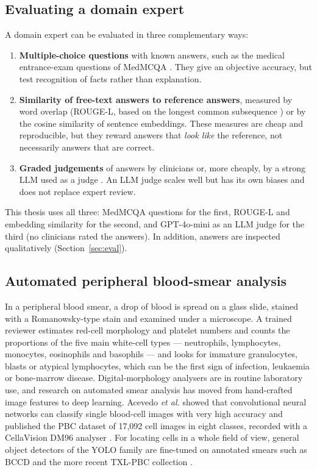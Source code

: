 \subsection{Evaluating a domain expert}

A domain expert can be evaluated in three complementary ways:
\begin{enumerate}
  \item \textbf{Multiple-choice questions} with known answers, such as the medical entrance-exam questions of MedMCQA \cite{pal2022medmcqa}. They give an objective accuracy, but test recognition of facts rather than explanation.
  \item \textbf{Similarity of free-text answers to reference answers}, measured by word overlap (ROUGE-L, based on the longest common subsequence \cite{lin2004rouge}) or by the cosine similarity of sentence embeddings. These measures are cheap and reproducible, but they reward answers that \emph{look like} the reference, not necessarily answers that are correct.
  \item \textbf{Graded judgements} of answers by clinicians or, more cheaply, by a strong LLM used as a judge \cite{zheng2023judge}. An LLM judge scales well but has its own biases and does not replace expert review.
\end{enumerate}
This thesis uses all three: MedMCQA questions for the first, ROUGE-L and embedding similarity for the second, and GPT-4o-mini as an LLM judge for the third (no clinicians rated the answers). In addition, answers are inspected qualitatively (Section~\ref{sec:eval}).

\subsection{Automated peripheral blood-smear analysis}

In a peripheral blood smear, a drop of blood is spread on a glass slide, stained with a Romanowsky-type stain and examined under a microscope. A trained reviewer estimates red-cell morphology and platelet numbers and counts the proportions of the five main white-cell types --- neutrophils, lymphocytes, monocytes, eosinophils and basophils --- and looks for immature granulocytes, blasts or atypical lymphocytes, which can be the first sign of infection, leukaemia or bone-marrow disease. Digital-morphology analysers are in routine laboratory use, and research on automated smear analysis has moved from hand-crafted image features to deep learning. Acevedo \emph{et al.} showed that convolutional neural networks can classify single blood-cell images with very high accuracy \cite{acevedo2019} and published the PBC dataset of 17{,}092 cell images in eight classes, recorded with a CellaVision DM96 analyser \cite{acevedo2020}. For locating cells in a whole field of view, general object detectors of the YOLO family \cite{jocher2023yolov8} are fine-tuned on annotated smears such as BCCD \cite{mooney2018bccd} and the more recent TXL-PBC collection \cite{gan2025txlpbc}.


